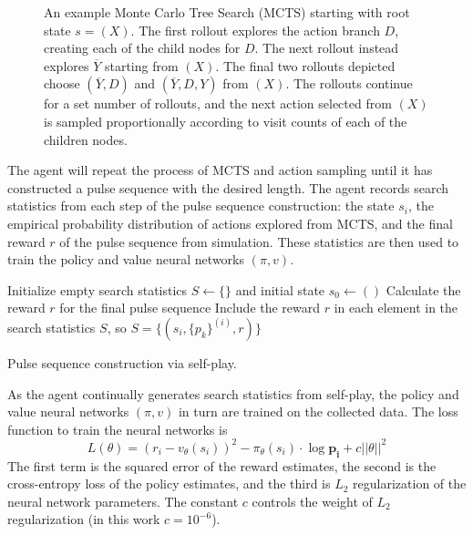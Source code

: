 \begin{figure}[H]
    \centering
    
    \caption{An example Monte Carlo Tree Search (MCTS) starting with root state $s = (X)$. The first rollout explores the action branch $D$, creating each of the child nodes for $D$. The next rollout instead explores $\overline{Y}$ starting from $(X)$. The final two rollouts depicted choose $(\overline{Y}, D)$ and $(\overline{Y}, D, Y)$ from $(X)$. The rollouts continue for a set number of rollouts, and the next action selected from $(X)$ is sampled proportionally according to visit counts of each of the children nodes.}
    \label{fig:mcts}
\end{figure}

The agent will repeat the process of MCTS and action sampling until it has constructed a pulse sequence with the desired length. The agent records search statistics from each step of the pulse sequence construction: the state $s_i$, the empirical probability distribution of actions explored from MCTS, and the final reward $r$ of the pulse sequence from simulation. These statistics are then used to train the policy and value neural networks $(\pi, v)$.


\begin{algorithm}[H]
\BlankLine
Initialize empty search statistics $S \leftarrow \{\}$
and initial state $s_0 \leftarrow ()$
\;
Calculate the reward $r$ for the final pulse sequence \;
Include the reward $r$ in each element in the search statistics $S$, so $S = \{ (s_i, \{p_k\}^{(i)}, r) \}$ \;
\caption{Pulse sequence construction via self-play. \label{al:make_sequence}}
\end{algorithm}

As the agent continually generates search statistics from self-play, the policy and value neural networks $(\pi, v)$ in turn are trained on the collected data. The loss function to train the neural networks is
\begin{equation}\label{eq:az_loss}
    L(\theta) = (r_i - v_\theta(s_i))^2 - \pi_\theta(s_i) \cdot \log \mathbf{p_i} + c ||\theta||^2
\end{equation}
The first term is the squared error of the reward estimates, the second is the cross-entropy loss of the policy estimates, and the third is $L_2$ regularization of the neural network parameters. The constant $c$ controls the weight of $L_2$ regularization (in this work $c = 10^{-6}$).

